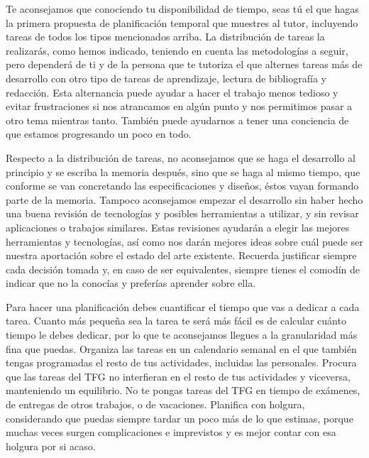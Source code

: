 {Te aconsejamos que conociendo tu disponibilidad de tiempo, seas tú el que hagas la primera propuesta de planificación temporal que muestres al tutor, incluyendo tareas de todos los tipos mencionados arriba. La distribución de tareas la realizarás, como hemos indicado, teniendo en cuenta las metodologías a seguir, pero dependerá de ti y de la persona que te tutoriza el que alternes tareas más de desarrollo con otro tipo de tareas de aprendizaje, lectura de bibliografía y redacción. Esta alternancia puede ayudar a hacer el trabajo menos tedioso y evitar frustraciones si nos atrancamos en algún punto y nos permitimos pasar a otro tema mientras tanto. También puede ayudarnos a tener una conciencia de que estamos progresando un poco en todo. 

Respecto a la distribución de tareas, no aconsejamos que se haga el desarrollo al principio y se escriba la memoria después, sino que se haga al mismo tiempo, que conforme se van concretando las especificaciones y diseños, éstos vayan formando parte de la memoria. Tampoco aconsejamos empezar el desarrollo sin haber hecho una buena revisión de tecnologías y posibles herramientas a utilizar, y sin revisar aplicaciones o trabajos similares. Estas revisiones ayudarán a elegir las mejores herramientas y tecnologías, así como nos darán mejores ideas sobre cuál puede ser nuestra aportación sobre el estado del arte existente. Recuerda justificar siempre cada decisión tomada y, en caso de ser equivalentes, siempre tienes el comodín de indicar que no la conocías y preferías aprender sobre ella.

Para hacer una planificación debes cuantificar el tiempo que vas a dedicar a cada tarea. Cuanto más pequeña sea la tarea te será más fácil es de calcular cuánto tiempo le debes dedicar, por lo que te aconsejamos llegues a la granularidad más fina que puedas. Organiza las tareas en un calendario semanal en el que también tengas programadas el resto de tus actividades, incluidas las personales. Procura que las tareas del TFG no interfieran en el resto de tus actividades y viceversa, manteniendo un equilibrio. No te pongas tareas del TFG en tiempo de exámenes, de entregas de otros trabajos, o de vacaciones. Planifica con holgura, considerando que puedas siempre tardar un poco más de lo que estimas, porque muchas veces surgen complicaciones e imprevistos y es mejor contar con esa holgura por si acaso.

}
